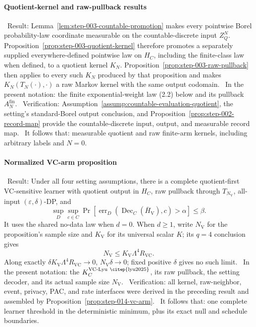 \paragraph{Quotient-kernel and raw-pullback results}

\noindent\textbullet\ Result: Lemma~\ref{lem:step-003-countable-promotion} makes every pointwise Borel
  probability-law coordinate measurable on the countable-discrete input
  \(Z_Q^N\). Proposition~\ref{prop:step-003-quotient-kernel} therefore promotes a
  separately supplied everywhere-defined pointwise law on \(H_C\), including
  the finite-class law when defined, to a quotient kernel \(K_N\). Proposition~\ref{prop:step-003-raw-pullback} then applies to every such
  \(K_N\) produced by that proposition and makes
  \(K_N(T_N(\cdot),\cdot)\) a raw Markov kernel with the same output codomain.
\noindent\textbullet\ In the present notation: the finite exponential-weight law (2.2) below and its
  pullback \(A_N^{\mathrm{fin}}\).
\noindent\textbullet\ Verification: Assumption~\ref{assump:countable-evaluation-quotient},
  the setting's standard-Borel output conclusion, and Proposition~\ref{prop:step-002-record-map} provide the countable-discrete
  input, output, and measurable record map.
\noindent\textbullet\ It follows that: measurable quotient and raw finite-arm kernels, including
  arbitrary labels and \(N=0\).

\paragraph{Normalized VC-arm proposition}

\noindent\textbullet\ Result: Under all four setting assumptions, there is a complete
  quotient-first VC-sensitive learner with quotient output in \(H_C\), raw
  pullback through \(T_{N_{\mathrm V}}\), all-input
  \((\varepsilon,\delta)\)-DP, and
  \[
  \sup_D\sup_{c\in C}
  \Pr[\operatorname{err}_D(\operatorname{Dec}_C(\bar H_{\mathrm V}),c)
  >\alpha]\le\beta.
  \]
  It uses the shared no-data law when \(d=0\). When \(d\ge1\), write
  \(N_{\mathrm V}\) for the proposition's sample size and
  \(K_{\mathrm V}\) for its universal scalar \(K\); its \(q=4\) conclusion
  gives
  \[
  N_{\mathrm V}\le K_{\mathrm V}\Lambda^4R_{\mathrm{VC}}.
  \tag{C.V}
  \]
  Along exactly \(\delta K_{\mathrm V}\Lambda^4R_{\mathrm{VC}}\to0\),
  \(N_{\mathrm V}\delta\to0\); fixed positive \(\delta\) gives no such
  limit.
\noindent\textbullet\ In the present notation: the 
  \(K_C^{\mathrm{VC\text{-}Lyu~\citep{lyu2025}}}\), its raw pullback, the setting decoder,
  and its actual sample size \(N_{\mathrm V}\).
\noindent\textbullet\ Verification: all kernel, raw-neighbor, event, privacy, PAC, and rate
  interfaces were derived in the preceding result and assembled by Proposition~\ref{prop:step-014-vc-arm}.
\noindent\textbullet\ It follows that: one complete learner threshold in the deterministic
  minimum, plus its exact null and schedule boundaries.

